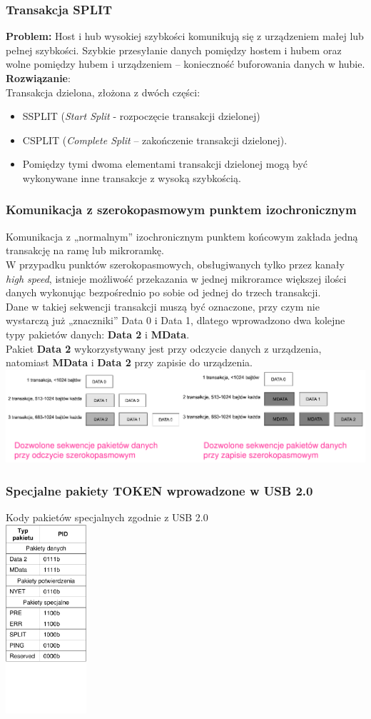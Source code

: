 	\subsubsection{Transakcja SPLIT}
	\textbf{Problem:} Host i hub wysokiej szybkości komunikują się z urządzeniem małej lub pełnej szybkości. Szybkie przesyłanie danych pomiędzy hostem i hubem oraz wolne pomiędzy hubem i urządzeniem – konieczność buforowania danych w hubie.\\
	\textbf{Rozwiązanie}:\\
	Transakcja dzielona, złożona z dwóch części:
	\begin{itemize}
		\item SSPLIT (\emph{Start Split} - rozpoczęcie transakcji dzielonej)
		\item CSPLIT (\emph{Complete Split} – zakończenie transakcji dzielonej).
		\item Pomiędzy tymi dwoma elementami transakcji dzielonej mogą być wykonywane inne transakcje z wysoką szybkością.
	\end{itemize}
	\subsubsection{Komunikacja z szerokopasmowym punktem izochronicznym}
	Komunikacja z „normalnym” izochronicznym punktem końcowym zakłada jedną transakcję na ramę lub mikroramkę.\\
	W przypadku punktów szerokopasmowych, obsługiwanych tylko przez kanały \emph{high speed}, istnieje możliwość przekazania w jednej mikroramce większej ilości danych wykonując bezpośrednio po sobie od jednej do trzech transakcji.\\
	Dane w takiej sekwencji transakcji muszą być oznaczone, przy czym nie wystarczą już „znaczniki” Data 0 i Data 1, dlatego wprowadzono dwa kolejne typy pakietów danych: \textbf{Data 2} i \textbf{MData}.\\
	Pakiet \textbf{Data 2} wykorzystywany jest przy odczycie danych z urządzenia, natomiast \textbf{MData} i \textbf{Data 2} przy zapisie do urządzenia.\\
	\includegraphics[width=15cm]{./wyklady/USB_56_1.pdf}
	\subsubsection{Specjalne pakiety TOKEN wprowadzone w USB 2.0}
	Kody pakietów specjalnych zgodnie z USB 2.0\\
	\includegraphics[width=3cm]{./wyklady/USB_57_1.pdf}